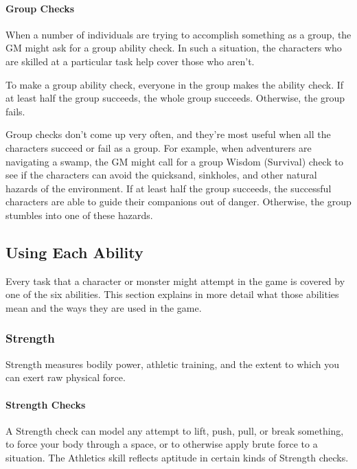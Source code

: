 \documentclass[
]{article}
\begin{document}
\hypertarget{group-checks}{%
\paragraph{Group Checks}\label{group-checks}}

When a number of individuals are trying to accomplish something as a
group, the GM might ask for a group ability check. In such a situation,
the characters who are skilled at a particular task help cover those who
aren't.

To make a group ability check, everyone in the group makes the ability
check. If at least half the group succeeds, the whole group succeeds.
Otherwise, the group fails.

Group checks don't come up very often, and they're most useful when all
the characters succeed or fail as a group. For example, when adventurers
are navigating a swamp, the GM might call for a group Wisdom (Survival)
check to see if the characters can avoid the quicksand, sinkholes, and
other natural hazards of the environment. If at least half the group
succeeds, the successful characters are able to guide their companions
out of danger. Otherwise, the group stumbles into one of these hazards.

\hypertarget{using-each-ability}{%
\subsection{Using Each Ability}\label{using-each-ability}}

Every task that a character or monster might attempt in the game is
covered by one of the six abilities. This section explains in more
detail what those abilities mean and the ways they are used in the game.

\hypertarget{strength-1}{%
\subsubsection{Strength}\label{strength-1}}

Strength measures bodily power, athletic training, and the extent to
which you can exert raw physical force.

\hypertarget{strength-checks}{%
\paragraph{Strength Checks}\label{strength-checks}}

A Strength check can model any attempt to lift, push, pull, or break
something, to force your body through a space, or to otherwise apply
brute force to a situation. The Athletics skill reflects aptitude in
certain kinds of Strength checks.
\end{document}
